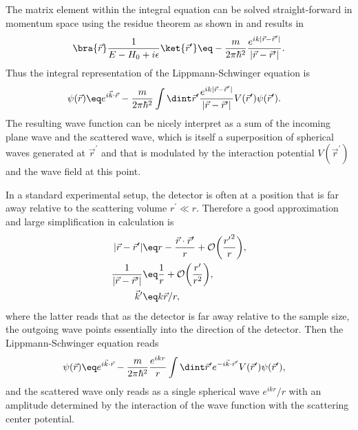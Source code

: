 \documentclass[\main/dresen_thesis.tex]{subfiles}
\begin{document}
The matrix element within the integral equation  can be solved straight-forward in momentum space using the residue theorem as shown in  and results in
\begin{align}
  \bra{\vec{r}}\frac{1}{E - H_0 + i \epsilon} \ket{\vec{r}^\prime} \eq -\frac{m}{2 \pi \hbar^2} \frac{e^{ik|\vec{r} - \vec{r}^\prime|}}{|\vec{r} - \vec{r}^\prime|}.
\end{align}
Thus the integral representation of the Lippmann-Schwinger equation is
\begin{align}
  \psi (\vec{r}) &\eq e^{i\vec{k} \cdot \vec{r}} - \frac{m}{2 \pi\hbar^2} \int \dint \vec{r}^\prime \frac{e^{ik|\vec{r} - \vec{r}^\prime|}}{|\vec{r} - \vec{r}^\prime|} V (\vec{r}^\prime)\psi (\vec{r}^\prime).
\end{align}
The resulting wave function can be nicely interpret as a sum of the incoming plane wave and the scattered wave, which is itself a superposition of spherical waves generated at $\vec{r}^\prime$ and that is modulated by the interaction potential $V(\vec{r}^\prime)$ and the wave field at this point.

In a standard experimental setup, the detector is often at a position that is far away relative to the scattering volume $r^\prime \ll r$. 
Therefore a good approximation and large simplification in calculation is
\begin{align}
  |\vec{r} - \vec{r}^\prime| \eq& r - \frac{\vec{r} \cdot \vec{r}^\prime}{r} + \mathcal{O}\bigg(\frac{{r^\prime}^2}{r}\bigg),\\
  \frac{1}{|\vec{r} - \vec{r}^\prime|} \eq& \frac{1}{r} + \mathcal{O}\bigg(\frac{r^\prime}{r^2} \bigg),\\
  \vec{k}^\prime \eq& k \vec{r} / r,
\end{align}
where the latter reads that as the detector is far away relative to the sample size, the outgoing wave points essentially into the direction of the detector. 
Then the Lippmann-Schwinger equation reads
\begin{align}
  \psi (\vec{r}) &\eq e^{i\vec{k} \cdot \vec{r}} - \frac{m}{2 \pi\hbar^2} \frac{e^{ikr}}{r} \int \dint \vec{r}^\prime e^{-i\vec{k} \cdot \vec{r}^\prime} V (\vec{r}^\prime)\psi (\vec{r}^\prime),
\end{align}
and the scattered wave only reads as a single spherical wave $e^{ikr} / r$ with an amplitude determined by the interaction of the wave function with the scattering center potential.
\end{document}
